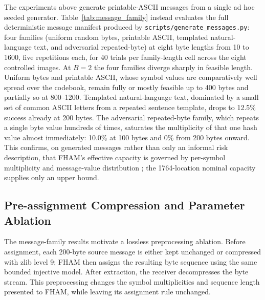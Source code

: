 \documentclass[preprint,12pt]{elsarticle}
\theoremstyle{plain}
\providecommand{\DIFaddtex}[1]{{\protect\color{blue} \sf #1}} %
\providecommand{\DIFdeltex}[1]{{\protect\color{red} \scriptsize #1}} %
\providecommand{\DIFaddbegin}{} %
\providecommand{\DIFaddend}{} %
\providecommand{\DIFdelbegin}{} %
\providecommand{\DIFdelend}{} %
\providecommand{\DIFadd}[1]{\texorpdfstring{\DIFaddtex{#1}}{#1}} %
\providecommand{\DIFdel}[1]{\texorpdfstring{\DIFdeltex{#1}}{}} %
\providecommand{\DIFscaledelfig}{0.5}
\newlength{\DIFdelgraphicswidth} %
\newlength{\DIFdelgraphicsheight} %
\providecommand{\DIFaddincludegraphics}[2][]{{\color{blue}\fbox{\DIFOincludegraphics[#1]{#2}}}} %
\providecommand{\DIFdelincludegraphics}[2][]{%
\sbox{\DIFdelgraphicsbox}{\DIFOincludegraphics[#1]{#2}}%
\settoboxwidth{\DIFdelgraphicswidth}{\DIFdelgraphicsbox} %
\settoboxtotalheight{\DIFdelgraphicsheight}{\DIFdelgraphicsbox} %
\scalebox{\DIFscaledelfig}{%
\parbox[b]{\DIFdelgraphicswidth}{\usebox{\DIFdelgraphicsbox}\\[-\baselineskip] \rule{\DIFdelgraphicswidth}{0em}}\llap{\resizebox{\DIFdelgraphicswidth}{\DIFdelgraphicsheight}{%
\setlength{\unitlength}{\DIFdelgraphicswidth}%
\begin{picture}(1,1)%
\thicklines\linethickness{2pt} %
{\color[rgb]{1,0,0}\put(0,0){\framebox(1,1){}}}%
{\color[rgb]{1,0,0}\put(0,0){\line( 1,1){1}}}%
{\color[rgb]{1,0,0}\put(0,1){\line(1,-1){1}}}%
\end{picture}%
}\hspace*{3pt}}} %
} %
\DeclareRobustCommand{\DIFaddbegin}{\DIFOaddbegin \let\includegraphics\DIFaddincludegraphics} %
\DeclareRobustCommand{\DIFaddend}{\DIFOaddend \let\includegraphics\DIFOincludegraphics} %
\DeclareRobustCommand{\DIFdelbegin}{\DIFOdelbegin \let\includegraphics\DIFdelincludegraphics} %
\DeclareRobustCommand{\DIFdelend}{\DIFOaddend \let\includegraphics\DIFOincludegraphics} %
\renewcommand{\DIFdel}[1]{}
\renewcommand{\DIFdelincludegraphics}[2][]{}
\begin{document}
The experiments above generate printable-ASCII messages from a single ad hoc
seeded generator. Table~\ref{tab:message_family} instead evaluates the full
deterministic message manifest produced by \texttt{scripts/generate\_messages.py}:
four families (uniform random bytes, printable ASCII, templated natural-language text, and
adversarial repeated-byte) at eight byte lengths from 10 to 1600, five
repetitions each, for 40 trials per family-length cell across the eight
controlled images. At $B=2$ the four families diverge sharply in feasible
length. Uniform bytes and printable ASCII, whose symbol values are
comparatively well spread over the codebook, remain fully or mostly feasible
up to 400 bytes and partially so at 800--1200. Templated natural-language text, dominated by a
small set of common ASCII letters from a repeated sentence template, drops to
12.5\% success already at 200 bytes. The adversarial repeated-byte family,
which repeats a single byte value hundreds of times, saturates the
multiplicity of that one hash value almost immediately: 10.0\% at 100 bytes
and 0\% from 200 bytes onward. This confirms, on generated messages rather
than only an informal risk description, that FHAM's effective capacity is
governed by per-symbol multiplicity and message-value distribution\DIFdelbegin \DIFdel{, not by
}\DIFdelend \DIFaddbegin \DIFadd{; }\DIFaddend the
1764-location nominal capacity \DIFdelbegin \DIFdel{alone}\DIFdelend \DIFaddbegin \DIFadd{supplies only an upper bound}\DIFaddend .

\begin{table}[!t]
\centering
\caption{Assignment Feasibility Rate by Message Family and Length ($B=2$)}
\label{tab:message_family}

\end{table}

\subsection{Pre-assignment Compression and Parameter Ablation}
The message-family results motivate a lossless preprocessing ablation. Before
assignment, each 200-byte source message is either kept unchanged or compressed
with zlib level 9; FHAM then assigns the resulting byte sequence using the same
bounded injective model. After extraction, the receiver decompresses the byte
stream. This preprocessing changes the symbol multiplicities and sequence
length presented to FHAM, while leaving its assignment rule unchanged.
\end{document}
